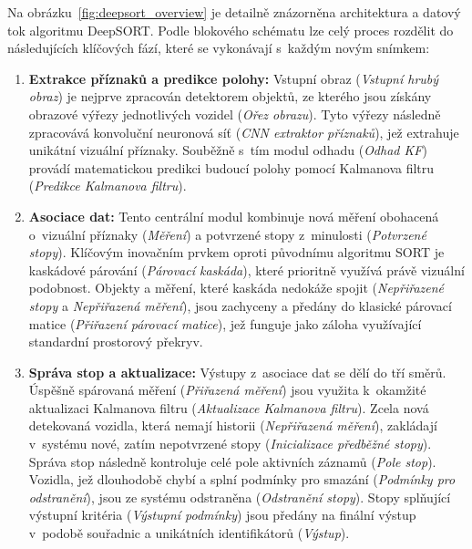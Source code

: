 Na obrázku~\ref{fig:deepsort_overview} je detailně znázorněna architektura a datový tok algoritmu DeepSORT. Podle blokového schématu lze celý proces rozdělit do následujících klíčových fází, které se vykonávají s~každým novým snímkem:

\begin{enumerate}
    \item \textbf{Extrakce příznaků a predikce polohy:} Vstupní obraz (\textit{Vstupní hrubý obraz}) je nejprve zpracován detektorem objektů, ze kterého jsou získány obrazové výřezy jednotlivých vozidel (\textit{Ořez obrazu}). Tyto výřezy následně zpracovává konvoluční neuronová síť (\textit{CNN extraktor příznaků}), jež extrahuje unikátní vizuální příznaky. Souběžně s~tím modul odhadu (\textit{Odhad KF}) provádí matematickou predikci budoucí polohy pomocí Kalmanova filtru (\textit{Predikce Kalmanova filtru}).
    
    \item \textbf{Asociace dat:} Tento centrální modul kombinuje nová měření obohacená o~vizuální příznaky (\textit{Měření}) a potvrzené stopy z~minulosti (\textit{Potvrzené stopy}). Klíčovým inovačním prvkem oproti původnímu algoritmu SORT je kaskádové párování (\textit{Párovací kaskáda}), které prioritně využívá právě vizuální podobnost. Objekty a měření, které kaskáda nedokáže spojit (\textit{Nepřiřazené stopy} a \textit{Nepřiřazená měření}), jsou zachyceny a předány do klasické párovací matice (\textit{Přiřazení párovací matice}), jež funguje jako záloha využívající standardní prostorový překryv.
    
    \item \textbf{Správa stop a aktualizace:} Výstupy z~asociace dat se dělí do tří směrů. Úspěšně spárovaná měření (\textit{Přiřazená měření}) jsou využita k~okamžité aktualizaci Kalmanova filtru (\textit{Aktualizace Kalmanova filtru}). Zcela nová detekovaná vozidla, která nemají historii (\textit{Nepřiřazená měření}), zakládají v~systému nové, zatím nepotvrzené stopy (\textit{Inicializace předběžné stopy}). Správa stop následně kontroluje celé pole aktivních záznamů (\textit{Pole stop}). Vozidla, jež dlouhodobě chybí a splní podmínky pro smazání (\textit{Podmínky pro odstranění}), jsou ze systému odstraněna (\textit{Odstranění stopy}). Stopy splňující výstupní kritéria (\textit{Výstupní podmínky}) jsou předány na finální výstup v~podobě souřadnic a unikátních identifikátorů (\textit{Výstup}).
\end{enumerate}

